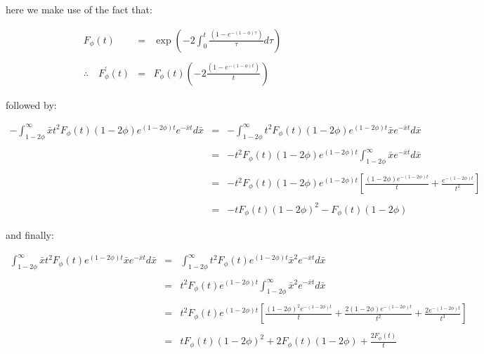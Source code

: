 here we make use of the fact that: \bigskip

\begin{eqnarray*}
							  F_{\phi}(t) & = & \exp \left( -2 \int_{0}^{t} \frac{(1 - e^{-(1 - \phi)\tau})}{\tau} d\tau \right) \\\\
	\therefore \quad F_{\phi}^{\prime}(t) & = & F_{\phi}(t) \left( -2 \frac{(1 - e^{-(1 - \phi)t})}{t} \right)
\end{eqnarray*}\medskip

followed by: \bigskip

\begin{eqnarray*}
	-\int_{1 - 2 \phi}^{\infty} \bar{x} t^2 F_{\phi}(t) (1 - 2 \phi) e^{(1 - 2 \phi)t} e^{-\bar{x} t} d\bar{x} & = & -\int_{1 - 2 \phi}^{\infty} t^2 F_{\phi}(t) (1 - 2 \phi) e^{(1 - 2 \phi)t} \bar{x} e^{-\bar{x} t} d\bar{x} \\\\
																											   & = & -t^2 F_{\phi}(t) (1 - 2 \phi) e^{(1 - 2 \phi)t} \int_{1 - 2 \phi}^{\infty} \bar{x} e^{-\bar{x} t} d\bar{x} \\\\
																											   & = & -t^2 F_{\phi}(t) (1 - 2 \phi) e^{(1 - 2 \phi)t} \left[ \frac{(1 - 2 \phi) e^{-(1 - 2 \phi)t}}{t} + \frac{e^{-(1 - 2 \phi)t}}{t^2} \right] \\\\
																											   & = & -t F_{\phi}(t) (1 - 2 \phi)^2 - F_{\phi}(t) (1 - 2 \phi)
\end{eqnarray*}\medskip

and finally: \bigskip

\begin{eqnarray*}
	\int_{1 - 2 \phi}^{\infty} \bar{x} t^2 F_{\phi}(t) e^{(1 - 2 \phi)t} \bar{x} e^{-\bar{x} t} d\bar{x} & = & \int_{1 - 2 \phi}^{\infty} t^2 F_{\phi}(t) e^{(1 - 2 \phi)t} \bar{x}^2 e^{-\bar{x} t} d\bar{x} \\\\
																										 & = & t^2 F_{\phi}(t) e^{(1 - 2 \phi)t} \int_{1 - 2 \phi}^{\infty} \bar{x}^2 e^{-\bar{x} t} d\bar{x} \\\\
																										 & = & t^2 F_{\phi}(t) e^{(1 - 2 \phi)t} \left[ \frac{(1 - 2 \phi)^2 e^{-(1 - 2 \phi)t}}{t} + \frac{2 (1 - 2 \phi) e^{-(1 - 2 \phi)t}}{t^2} + \frac{2 e^{-(1 - 2 \phi)t}}{t^3} \right] \\\\
																										 & = & t F_{\phi}(t) (1 - 2 \phi)^2 + 2 F_{\phi}(t) (1 - 2 \phi) + \frac{2 F_{\phi}(t)}{t} 
\end{eqnarray*}\medskip

